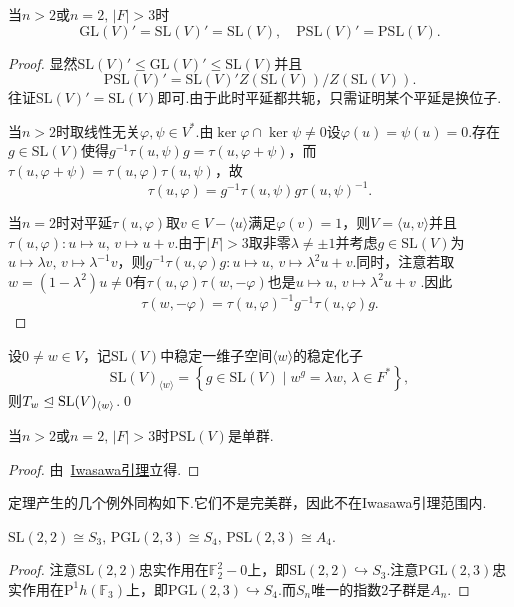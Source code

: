 \begin{prop}
	当$n>2$或$n=2,\,|F|>3$时
	\[
		\mathrm{GL}(V)'=\mathrm{SL}(V)'=\mathrm{SL}(V),\quad\mathrm{PSL}(V)'=\mathrm{PSL}(V).
	\]
\end{prop}
\begin{proof}
	显然$\mathrm{SL}(V)'\le\mathrm{GL}(V)'\le\mathrm{SL}(V)$并且
	\[
		\mathrm{PSL}(V)'=\mathrm{SL}(V)'Z(\mathrm{SL}(V))/Z(\mathrm{SL}(V)).
	\]
	往证$\mathrm{SL}(V)'=\mathrm{SL}(V)$即可.由于此时平延都共轭，只需证明某个平延是换位子.

	当$n>2$时取线性无关$\varphi,\psi\in V^*$.由$\ker\varphi\cap\ker\psi\ne 0$设$\varphi(u)=\psi(u)=0$.存在$g\in\mathrm{SL}(V)$使得$g^{-1}\tau(u,\psi)g=\tau(u,\varphi+\psi)$，而$\tau(u,\varphi+\psi)=\tau(u,\varphi)\tau(u,\psi)$，故
	\[
		\tau(u,\varphi)=g^{-1}\tau(u,\psi)g\tau(u,\psi)^{-1}.
	\]

	当$n=2$时对平延$\tau(u,\varphi)$取$v\in V-\langle u\rangle $满足$\varphi(v)=1$，则$V=\langle u,v\rangle $并且$\tau(u,\varphi)\colon u\mapsto u,\,v\mapsto u+v$.由于$|F|>3$取非零$\lambda\ne\pm 1$并考虑$g\in\mathrm{SL}(V)$为$u\mapsto\lambda v,\,v\mapsto\lambda^{-1}v$，则$g^{-1}\tau(u,\varphi)g\colon u\mapsto u,\,v\mapsto \lambda^2u+v$.同时，注意若取$w=(1-\lambda^2)u\ne 0$有$\tau(u,\varphi)\tau(w,-\varphi)$也是$u\mapsto u,\,v\mapsto\lambda^2u+v$	.因此
	\[
		\tau(w,-\varphi)=\tau(u,\varphi)^{-1}g^{-1}\tau(u,\varphi)g.
	\]
\end{proof}
\begin{lemma}
	设$0\ne w\in V$，记$\mathrm{SL}(V)$中稳定一维子空间$\langle w\rangle $的稳定化子
	\[
		\mathrm{SL}(V)_{\langle w\rangle}=\left\{g\in\mathrm{SL}(V)\mid w^g=\lambda w,\,\lambda\in F^*\right\},
	\]
	则$T_w\trianglelefteq\mathrm{SL}(V)_{\langle w\rangle }$.\qed
\end{lemma}
\begin{thm}
	当$n>2$或$n=2,\,|F|>3$时$\mathrm{PSL}(V)$是单群.
\end{thm}
\begin{proof}
	由~\hyperlink{lemma:Iwasawa}{Iwasawa引理}立得.
\end{proof}

定理产生的几个例外同构如下.它们不是完美群，因此不在Iwasawa引理范围内.
\begin{prop}
	$\mathrm{SL}(2,2)\cong S_3,\,\mathrm{PGL}(2,3)\cong S_4,\,\mathrm{PSL}(2,3)\cong A_4$.
\end{prop}
\begin{proof}
	注意$\mathrm{SL}(2,2)$忠实作用在$\mathbb{F}_2^2-0$上，即$\mathrm{SL}(2,2)\hookrightarrow S_3$.注意$\mathrm{PGL}(2,3)$忠实作用在$\bm{\mathrm{P}}^1h(\mathbb{F}_3)$上，即$\mathrm{PGL}(2,3)\hookrightarrow S_4$.而$S_n$唯一的指数$2$子群是$A_n$.
\end{proof}

